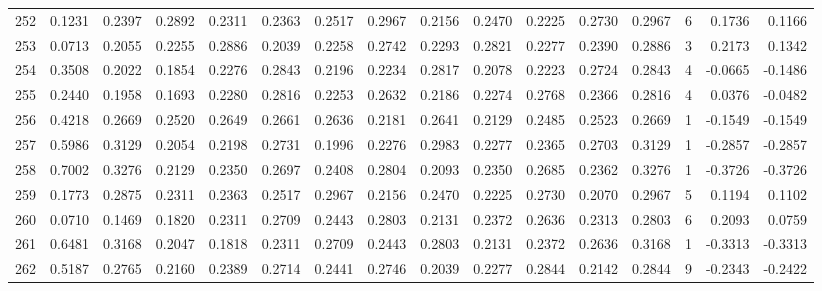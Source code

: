 \begin{tabular}{lrrrrrrrrrrrrrrr}
252 &      0.1231 &  0.2397 &  0.2892 &  0.2311 &  0.2363 &  0.2517 &  0.2967 &  0.2156 &  0.2470 &  0.2225 &   0.2730 &     0.2967 &      6 &                    0.1736 &                     0.1166 \\
253 &      0.0713 &  0.2055 &  0.2255 &  0.2886 &  0.2039 &  0.2258 &  0.2742 &  0.2293 &  0.2821 &  0.2277 &   0.2390 &     0.2886 &      3 &                    0.2173 &                     0.1342 \\
254 &      0.3508 &  0.2022 &  0.1854 &  0.2276 &  0.2843 &  0.2196 &  0.2234 &  0.2817 &  0.2078 &  0.2223 &   0.2724 &     0.2843 &      4 &                   -0.0665 &                    -0.1486 \\
255 &      0.2440 &  0.1958 &  0.1693 &  0.2280 &  0.2816 &  0.2253 &  0.2632 &  0.2186 &  0.2274 &  0.2768 &   0.2366 &     0.2816 &      4 &                    0.0376 &                    -0.0482 \\
256 &      0.4218 &  0.2669 &  0.2520 &  0.2649 &  0.2661 &  0.2636 &  0.2181 &  0.2641 &  0.2129 &  0.2485 &   0.2523 &     0.2669 &      1 &                   -0.1549 &                    -0.1549 \\
257 &      0.5986 &  0.3129 &  0.2054 &  0.2198 &  0.2731 &  0.1996 &  0.2276 &  0.2983 &  0.2277 &  0.2365 &   0.2703 &     0.3129 &      1 &                   -0.2857 &                    -0.2857 \\
258 &      0.7002 &  0.3276 &  0.2129 &  0.2350 &  0.2697 &  0.2408 &  0.2804 &  0.2093 &  0.2350 &  0.2685 &   0.2362 &     0.3276 &      1 &                   -0.3726 &                    -0.3726 \\
259 &      0.1773 &  0.2875 &  0.2311 &  0.2363 &  0.2517 &  0.2967 &  0.2156 &  0.2470 &  0.2225 &  0.2730 &   0.2070 &     0.2967 &      5 &                    0.1194 &                     0.1102 \\
260 &      0.0710 &  0.1469 &  0.1820 &  0.2311 &  0.2709 &  0.2443 &  0.2803 &  0.2131 &  0.2372 &  0.2636 &   0.2313 &     0.2803 &      6 &                    0.2093 &                     0.0759 \\
261 &      0.6481 &  0.3168 &  0.2047 &  0.1818 &  0.2311 &  0.2709 &  0.2443 &  0.2803 &  0.2131 &  0.2372 &   0.2636 &     0.3168 &      1 &                   -0.3313 &                    -0.3313 \\
262 &      0.5187 &  0.2765 &  0.2160 &  0.2389 &  0.2714 &  0.2441 &  0.2746 &  0.2039 &  0.2277 &  0.2844 &   0.2142 &     0.2844 &      9 &                   -0.2343 &                    -0.2422 \\

\end{tabular}
